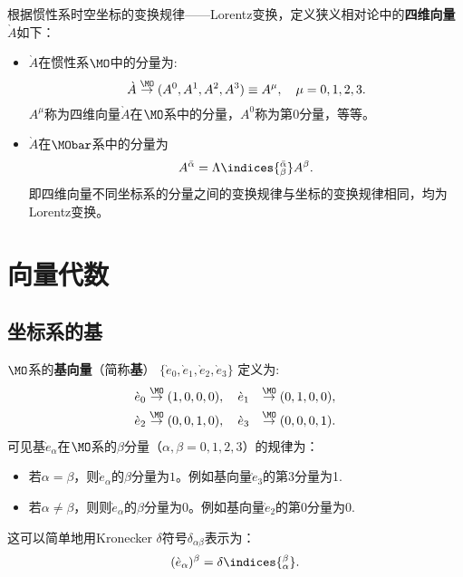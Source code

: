 根据惯性系时空坐标的变换规律——Lorentz变换，定义狭义相对论中的{\bf 四维向量}$\grave{A}$如下：
\begin{itemize}
    \item $\grave{A}$在惯性系$\MO$中的分量为:
    \[ \grave{A} \stackrel{\MO}{\rightarrow} (A^0, A^1, A^2, A^3) \equiv A^\mu, \quad \mu = 0, 1, 2, 3. \]
    $A^\mu$称为四维向量$\grave{A}$在$\MO$系中的分量，$A^0$称为第$0$分量，等等。
    \item $\grave{A}$在$\MObar$系中的分量为
    \begin{equation}
        A^{\bar{\alpha}} = \Lambda\indices{^{\bar{\alpha}}_\beta} A^\beta.
    \end{equation}
    即四维向量不同坐标系的分量之间的变换规律与坐标的变换规律相同，均为Lorentz变换。
\end{itemize}

\section{向量代数}
\label{sec:vecAlg}
\subsection{坐标系的基}
\label{subsec:basis}
$\MO$系的{\bf 基向量}（简称{\bf 基}） $\{ \grave{e}_0, \grave{e}_1, \grave{e}_2, \grave{e}_3 \}$ 定义为:
\begin{equation}
\begin{split}
	\grave{e}_0 &\stackrel{\MO}{\rightarrow} (1, 0, 0, 0), \quad	\grave{e}_1 &\stackrel{\MO}{\rightarrow} (0, 1, 0, 0), \\
	\grave{e}_2 &\stackrel{\MO}{\rightarrow} (0, 0, 1, 0), \quad
	\grave{e}_3 &\stackrel{\MO}{\rightarrow} (0, 0, 0, 1). \\
\end{split}
\end{equation}
可见基$\grave{e}_\alpha$在$\MO$系的$\beta$分量（$\alpha, \beta = 0, 1, 2, 3$）的规律为：
\begin{itemize}
	\item 若$\alpha = \beta$，则$\grave{e}_\alpha$的$\beta$分量为$1$。例如基向量$\grave{e}_3$的第3分量为1.
	\item 若$\alpha \neq \beta$，则则$\grave{e}_\alpha$的$\beta$分量为$0$。例如基向量$\grave{e}_2$的第0分量为0.
\end{itemize}
这可以简单地用Kronecker $\delta$符号$\delta_{\alpha \beta}$表示为：
\begin{equation}
	(\grave{e}_\alpha)^\beta = \delta\indices{_\alpha^\beta}.
\end{equation}

